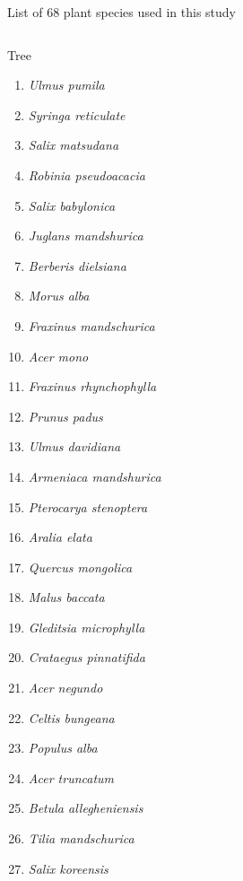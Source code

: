 \appendix
\begin{frame}[shrink]{List of 68 plant species used in this study}
\tiny
\begin{columns}[T,onlytextwidth]
	\begin{block}{Tree}
		\begin{enumerate}
			\item \emph{Ulmus pumila} \item \emph{Syringa reticulate} \item \emph{Salix matsudana}
			\item \emph{Robinia pseudoacacia} \item \emph{Salix babylonica} \item \emph{Juglans mandshurica}
			\item \emph{Berberis dielsiana} \item \emph{Morus alba} \item \emph{Fraxinus mandschurica}
			\item \emph{Acer mono}	\item \emph{Fraxinus rhynchophylla}
			\item \emph{Prunus padus}	\item \emph{Ulmus davidiana} \item \emph{Armeniaca mandshurica}
			\item \emph{Pterocarya stenoptera}	\item \emph{Aralia elata} \item \emph{Quercus mongolica}
			\item \emph{Malus baccata}	\item \emph{Gleditsia microphylla } \item \emph{Crataegus pinnatifida}
			\item \emph{Acer negundo}	\item \emph{Celtis bungeana} \item \emph{Populus alba}
			\item \emph{Acer truncatum}	\item \emph{Betula allegheniensis} \item \emph{Tilia mandschurica}
			\item \emph{Salix koreensis}			
		\end{enumerate}	
	\end{block}
	

\end{columns}
\end{frame}

